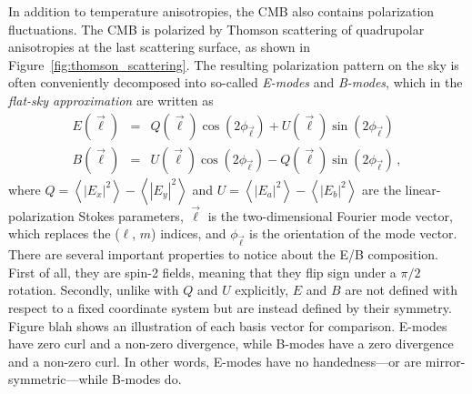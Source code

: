 In addition to temperature anisotropies, the CMB also contains polarization fluctuations. The CMB is polarized by Thomson scattering of quadrupolar anisotropies at the last scattering surface, as shown in Figure~\ref{fig:thomson_scattering}. The resulting polarization pattern on the sky is often conveniently decomposed into so-called \textit{E-modes} and \textit{B-modes}, which in the \textit{flat-sky approximation} are written as
\begin{eqnarray}
    E(\vec{\ell}) & = & Q(\vec{\ell}) \cos(2 \phi_{\vec{\ell}}) + U(\vec{\ell}) \sin(2 \phi_{\vec{\ell}}) \\
    B(\vec{\ell}) & = & U(\vec{\ell}) \cos(2 \phi_{\vec{\ell}}) - Q(\vec{\ell})\sin(2 \phi_{\vec{\ell}}) \, ,
    \label{eq:emodes_bmodes}
\end{eqnarray}
where $Q = \left< \left| E_{x} \right|^{2} \right> - \left< \left| E_{y} \right|^{2} \right>$ and $U = \left< \left| E_{a} \right|^{2} \right> - \left< \left| E_{b} \right|^{2} \right>$ are the linear-polarization Stokes parameters, $\vec{\ell}$ is the two-dimensional Fourier mode vector, which replaces the ($\ell$, $m$) indices, and $\phi_{\vec{\ell}}$ is the orientation of the mode vector. There are several important properties to notice about the E/B composition. First of all, they are spin-2 fields, meaning that they flip sign under a $\pi/2$ rotation. Secondly, unlike with $Q$ and $U$ explicitly, $E$ and $B$ are not defined with respect to a fixed coordinate system but are instead defined by their symmetry. Figure blah shows an illustration of each basis vector for comparison. E-modes have zero curl and a non-zero divergence, while B-modes have a zero divergence and a non-zero curl. In other words, E-modes have no handedness---or are mirror-symmetric---while B-modes do.

